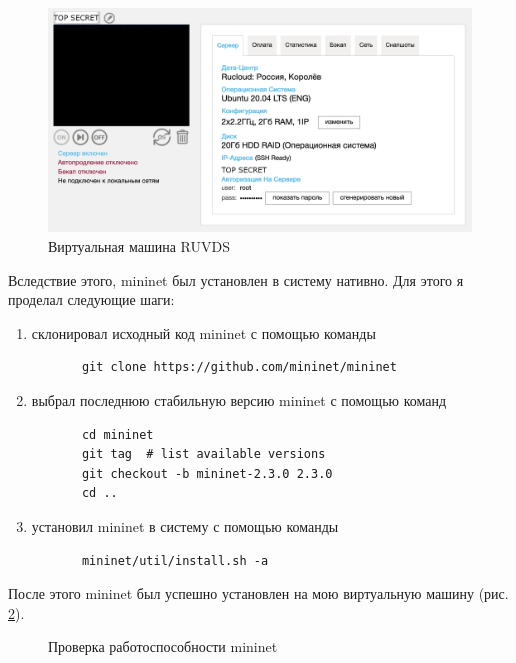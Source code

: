 \documentclass[a4paper, 14pt]{extarticle}
\begin{document}
\begin{figure}[H]
  \centering
  \includegraphics[width=\textwidth]{images/ruvds.png}
  \caption{Виртуальная машина RUVDS}
  \label{fig:ruvds}
\end{figure}

Вследствие этого, mininet был установлен в систему нативно. Для этого я проделал
следующие шаги:
\begin{enumerate}
  \item склонировал исходный код mininet с помощью команды
  \begin{verbatim}
       git clone https://github.com/mininet/mininet
  \end{verbatim}
  \item выбрал последнюю стабильную версию mininet с помощью команд
  \begin{verbatim}
       cd mininet
       git tag  # list available versions
       git checkout -b mininet-2.3.0 2.3.0
       cd ..
  \end{verbatim}
  \item установил mininet в систему с помощью команды
  \begin{verbatim}
       mininet/util/install.sh -a
  \end{verbatim}
\end{enumerate}

После этого mininet был успешно установлен на мою виртуальную машину (рис.
\ref{fig:mininet}).

\begin{figure}[H]
  \centering
  \caption{Проверка работоспособности mininet}
  \label{fig:mininet}
\end{figure}
\end{document}
